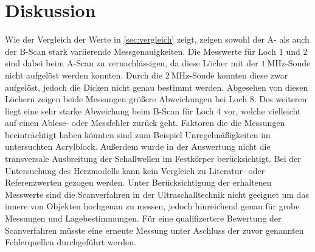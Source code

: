 \section{Diskussion}
\label{sec:Diskussion}
Wie der Vergleich der Werte in \ref{sec:vergleich} zeigt, zeigen sowohl der A- als auch der B-Scan stark variierende Messgenauigkeiten.
Die Messwerte für Loch 1 und 2 sind dabei beim A-Scan zu vernachlässigen, da diese Löcher mit der $\SI{1}{\mega\hertz}$-Sonde nicht aufgelöst werden konnten.
Durch die $\SI{2}{\mega\hertz}$-Sonde konnten diese zwar aufgelöst, jedoch die Dicken nicht genau bestimmt werden.
Abgesehen von diesen Löchern zeigen beide Messungen größere Abweichungen bei Loch 8. Des weiteren liegt eine sehr starke Abweichung beim B-Scan für Loch 4 vor, welche vielleicht
auf einen Ablese- oder Messfehler zurück geht. Faktoren die die Messungen beeinträchtigt haben könnten sind zum Beispiel Unregelmäßigkeiten im untersuchten Acrylblock.
Außerdem wurde in der Auswertung nicht die transversale Ausbreitung der Schallwellen im Festkörper berücksichtigt. Bei der Untersuchung des Herzmodells kann kein Vergleich zu
Literatur- oder Referenzwerten gezogen werden. Unter Berücksichtigung der erhaltenen Messwerte sind die Scanverfahren in der Ultraschalltechnik nicht geeignet um das innere von
Objekten hochgenau zu messen, jedoch hinreichend genau für grobe Messungen und Lagebestimmungen. Für eine qualifizertere Bewertung der Scanverfahren müsste eine erneute Messung unter
Aschluss der zuvor genannten Fehlerquellen durchgeführt werden. 
